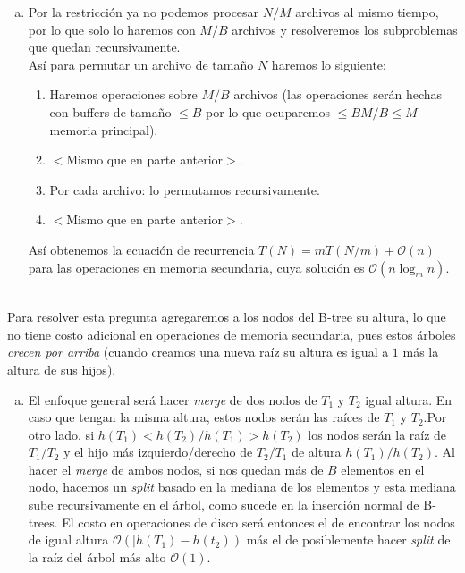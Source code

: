 \documentclass[dcc,uchile]{fcfmcourse}
\theoremstyle{plain}
\theoremstyle{definition}
\begin{document}
\begin{problems}
\begin{enumerate}[a)]
\begin{enumerate}[1.]
\end{enumerate}
\item Por la restricción ya no podemos procesar $N/M$ archivos al mismo tiempo, por lo que solo lo haremos con $M/B$ archivos y resolveremos los subproblemas que quedan recursivamente.\\
Así para permutar un archivo de tamaño $N$ haremos lo siguiente:
\begin{enumerate}[1.]
    \item Haremos operaciones sobre $M/B$ archivos (las operaciones serán hechas con buffers de tamaño $\le B$ por lo que ocuparemos $\le BM/B \le M$ memoria principal).
    \item $<$Mismo que en parte anterior$>$.
    \item Por cada archivo: lo permutamos recursivamente.
    \item $<$Mismo que en parte anterior$>$.
\end{enumerate}
Así obtenemos la ecuación de recurrencia $T(N) = m T(N/m) + \mathcal{O}(n)$ para las operaciones en memoria secundaria, cuya solución es $\mathcal{O}(n\log_m n)$.
\end{enumerate}
\\
Para resolver esta pregunta agregaremos a los nodos del B-tree su altura, lo que no tiene costo adicional en operaciones de memoria secundaria, pues estos árboles \textit{crecen por arriba} (cuando creamos una nueva raíz su altura es igual a $1$ más la altura de sus hijos).
\begin{enumerate}[a)]
    \item El enfoque general será hacer \textit{merge} de dos nodos de $T_{1}$ y $T_{2}$ igual altura. En caso que tengan la misma altura, estos nodos serán las raíces de $T_{1}$ y $T_{2}$.Por otro lado, si $h(T_{1}) < h(T_{2})/h(T_{1}) > h(T_{2})$ los nodos serán la raíz de $T_{1}/T_{2}$ y el hijo más izquierdo/derecho de $T_{2}/T_{1}$ de altura $h(T_{1})/h(T_{2})$. Al hacer el \textit{merge} de ambos nodos, si nos quedan más de $B$ elementos en el nodo, hacemos un \textit{split} basado en la mediana de los elementos y esta mediana sube recursivamente en el árbol, como sucede en la inserción normal de B-trees. El costo en operaciones de disco será entonces el de encontrar los nodos de igual altura $\mathcal{O}(|h(T_{1})-h(t_{2}))$ más el de posiblemente hacer \textit{split} de la raíz del árbol más alto $\mathcal{O}(1)$.
    

\end{enumerate}
\end{problems}
\end{document}
